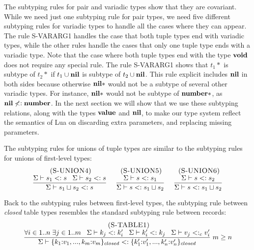 The subtyping rules for pair and variadic types show that they are covariant.
While we need just one subtyping rule for pair types,
we need five different subtyping rules for variadic types
to handle all the cases where they can appear.
The rule \textsc{S-VARARG1} handles the case that both tuple types end
with variadic types, while the other rules handle the cases that only
one tuple type ends with a variadic type.
Note that the case where both tuple types end with the type $\mathbf{void}$ does
not require any special rule.
The rule \textsc{S-VARARG1} shows that $t_{1}{*}$ is subtype of $t_{2}{*}$
if $t_{1} \cup \mathbf{nil}$ is subtype of $t_{2} \cup \mathbf{nil}$.
This rule explicit includes $\mathbf{nil}$ in both sides because otherwise
$\mathbf{nil}{*}$ would not be a subtype of several other variadic types.
For instance, $\mathbf{nil}{*}$ would not be subtype of $\mathbf{number}{*}$,
as $\mathbf{nil} \not<: \mathbf{number}$.
In the next section we will show that we use these subtyping relations,
along with the types $\mathbf{value}$ and $\mathbf{nil}$, to make our type system reflect
the semantics of Lua on discarding extra parameters, and
replacing missing parameters.

The subtyping rules for unions of tuple types are similar to the
subtyping rules for unions of first-level types:
\[
\begin{array}{c}
\begin{array}{c}
\; (\textsc{S-UNION4})\\
\dfrac{\Sigma \vdash s_{1} <: s \;\;\;
       \Sigma \vdash s_{2} <: s}
      {\Sigma \vdash s_{1} \sqcup s_{2} <: s}
\end{array}
\;
\begin{array}{c}
\; (\textsc{S-UNION5})\\
\dfrac{\Sigma \vdash s <: s_{1}}
      {\Sigma \vdash s <: s_{1} \sqcup s_{2}}
\end{array}
\;
\begin{array}{c}
\; (\textsc{S-UNION6})\\
\dfrac{\Sigma \vdash s <: s_{2}}
      {\Sigma \vdash s <: s_{1} \sqcup s_{2}}
\end{array}
\end{array}
\]

Back to the subtyping rules between first-level types,
the subtyping rule between \emph{closed} table types resembles the
standard subtyping rule between records:
\[
\begin{array}{c}
\; (\textsc{S-TABLE1})\\
\dfrac{\forall i \in 1..n \; \exists j \in 1..m \;\;\;
       \Sigma \vdash k_{j} <: k_{i}' \;\;\;
       \Sigma \vdash k_{i}' <: k_{j} \;\;\;
       \Sigma \vdash v_{j} <:_{c} v_{i}'}
      {\Sigma \vdash \{k_{1}{:}v_{1}, ..., k_{m}{:}v_{m}\}_{closed} <: \{k_{1}'{:}v_{1}', ..., k_{n}'{:}v_{n}'\}_{closed}} \; m \ge n
\end{array}
\]

